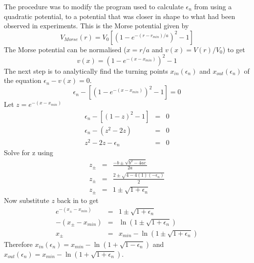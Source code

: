 \documentclass[a4paper]{IEEEtran}
\begin{document}
      The procedure was to modify the program used to calculate
      $\epsilon_n$ from using a quadratic potential, to a potential that
      was closer in shape to what had been observed in experiments.
      This is the Morse potential given by
      \begin{equation}
      V_{Morse}(r) = V_0\left[\left(1-e^{-(r-r_{min})/a}\right)^2 - 1\right]
      \end{equation}
      The Morse potential can be normalised ($x=r/a$ and $v(x)=V(r)/V_0$)
      to get
      \begin{equation}
            v(x) = \left( 1 - e^{-(x-x_{min})} \right)^2 - 1
      \end{equation}
      The next step is to analytically find the turning points
      $x_{in}(\epsilon_n)$ and $x_{out}(\epsilon_n)$ of the 
      equation $\epsilon_n - v(x) = 0$.
      \[ \epsilon_n - \left[ \left( 1 - e^{-(x-x_{min})} \right)^2 - 1 \right] 
                                                 =  0 \]
      Let $z = e^{-(x - x_{min})}$
      \begin{eqnarray}
            \epsilon_n - [ (1-z)^2 - 1] & = & 0\nonumber \\
            \epsilon_n - (z^2 - 2z) & = & 0 \nonumber \\
            z^2 - 2z - \epsilon_n & = & 0 \nonumber
      \end{eqnarray}
      Solve for z using
      \begin{eqnarray}
       z_\pm & = & \frac{-b \pm \sqrt{b^2 - 4ac} }{2a} \nonumber \\
       z_\pm & = & \frac{2 \pm \sqrt{4 - 4(1)(-\epsilon_n)} }{2} \nonumber \\
       z_\pm & = & 1 \pm \sqrt{1 + \epsilon_n} \nonumber
      \end{eqnarray}
      Now substitute $z$ back in to get
      \begin{eqnarray}
            e^{-(x_{\pm} - x_{min})} & = & 1 \pm \sqrt{1 + \epsilon_n} \nonumber \\
            -(x_{\pm} - x_{min}) & = & 
                        \ln\left(1 \pm \sqrt{1 + \epsilon_n}\right) \nonumber\\
            x_{\pm} & = & x_{min} - 
                  \ln \left( 1  \pm \sqrt{1+\epsilon_n} \right) \nonumber
      \end{eqnarray}
      Therefore $x_{in}(\epsilon_n) = x_{min} - \ln(1 + \sqrt{1-\epsilon_n})$ and
      $x_{out}(\epsilon_n) = x_{min} - \ln(1 + \sqrt{1+\epsilon_n})$.
\end{document}
